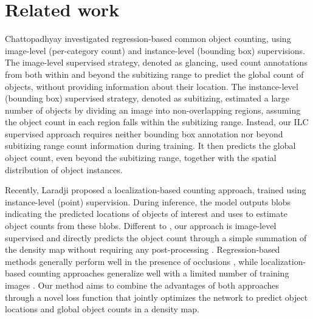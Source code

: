 \documentclass[10pt,twocolumn,letterpaper]{article}
\begin{document}
\vspace{-0.15cm}
\section{Related work}







Chattopadhyay \etal\cite{Chattopadhyay_2017_CVPR} investigated regression-based common object counting, using image-level (per-category count) and instance-level (bounding box) supervisions. The image-level supervised strategy, denoted as glancing, used count annotations from both within and beyond the subitizing range to predict the global count of objects, without providing information about their location. The instance-level (bounding box) supervised strategy, denoted as subitizing, estimated a large number of objects by dividing an image into non-overlapping regions, assuming the object count in each region falls within the subitizing range. Instead, our ILC supervised approach requires neither bounding box annotation nor beyond subitizing range count information during training. It then predicts the global object count, even beyond the subitizing range, together with the spatial distribution of object instances. 


 Recently, Laradji \etal \cite{WhereAreBlobsECCV18} proposed a localization-based counting approach, trained using instance-level (point) supervision\cite{point_feifei}. During inference, the model outputs blobs indicating the predicted locations of objects of interest and uses \cite{connectedComponent} to estimate object counts from these blobs. Different to \cite{WhereAreBlobsECCV18}, our approach is image-level supervised and directly predicts the object count through a simple summation of the density map without requiring any post-processing \cite{connectedComponent}.
 Regression-based  methods  generally perform well in the presence of occlusions \cite{Chattopadhyay_2017_CVPR, OxfordDensityNIPS2010}, while 
 localization-based counting approaches \cite{WhereAreBlobsECCV18,Girshick15ICCV} generalize well with a limited number of training images \cite{OxfordDensityNIPS2010,WhereAreBlobsECCV18}. Our method aims to combine the advantages of both approaches through a novel loss function that jointly optimizes the network to predict object locations and global object counts in a density map. 
\end{document}
